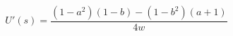 $$
U'(s) = \frac{\left(1 - a^{2}\right) \left(1 - b\right) - \left(1 - b^{2}\right) \left(a + 1\right)}{4 w}
$$
